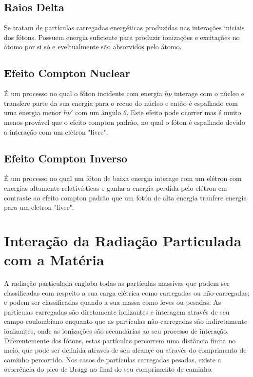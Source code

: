 \documentclass[11pt,a4paper]{article}
\begin{document}
        \subsection{Raios Delta}

        Se tratam de partículas carregadas energéticas produzidas nas interações iniciais dos fótons. Possuem energia suficiente para produzir ionizações e excitações no átomo por si só e eveltualmente são absorvidos pelo átomo.

        \subsection{Efeito Compton Nuclear}

            É um processo no qual o fóton incidente com energia $h\nu$ interage com o núcleo e transfere parte da sua energia para o recuo do núcleo e então é espalhado com uma energia menor $h\nu'$ com um ângulo $\theta$. Este efeito pode ocorrer mas é muito menos provável que o efeito compton padrão, no qual o fóton é espalhado devido a interação com um elétron "livre".

        \subsection{Efeito Compton Inverso}

            É um processo no qual um fóton de baixa energia interage com um elétron com energias altamente relativísticas e ganha a energia perdida pelo elétron em contraste ao efeito compton padrão que um fotón de alta energia tranfere energia para um eletron "livre". 
        
    \section{Interação da Radiação Particulada com a Matéria}

       A radiação particulada engloba todas as partículas massivas que podem ser classificadas com respeito a sua carga elétrica como carregadas ou não-carregadas; e podem ser classificadas quando a sua massa como leves ou pesadas. As partículas carregadas são diretamente ionizantes e interagem através de seu campo coulombiano enquanto que as partículas não-carregadas são indiretamente ionizantes, onde as ionizações são secundárias ao seu processo de interação. Diferentemente dos fótons, estas partículas percorrem uma distância finita no meio, que pode ser definida através de seu alcançe ou através do comprimento de caminho percorrido. Nos casos de partículas carregadas pesadas, existe a ocorrência do pico de Bragg no final do seu comprimento de caminho.
\end{document}
